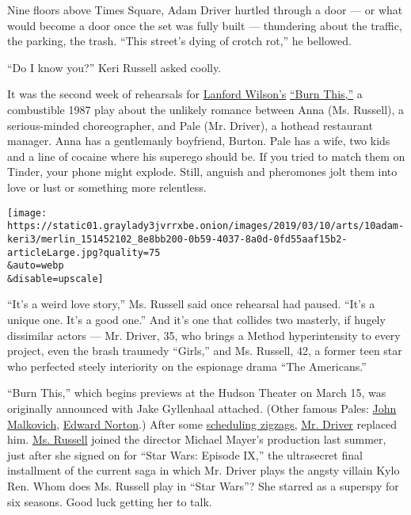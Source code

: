 Nine floors above Times Square, Adam Driver hurtled through a door ---
or what would become a door once the set was fully built --- thundering
about the traffic, the parking, the trash. ``This street's dying of
crotch rot,'' he bellowed.

``Do I know you?'' Keri Russell asked coolly.

It was the second week of rehearsals for
\href{https://www.nytimes3xbfgragh.onion/2011/03/25/theater/lanford-wilson-pulitzer-prize-winning-playwright-dies-at-73.html}{Lanford
Wilson's}
\href{http://www.thehudsonbroadway.com/whatson/burn-this/}{``Burn
This,''} a combustible 1987 play about the unlikely romance between Anna
(Ms. Russell), a serious-minded choreographer, and Pale (Mr. Driver), a
hothead restaurant manager. Anna has a gentlemanly boyfriend, Burton.
Pale has a wife, two kids and a line of cocaine where his superego
should be. If you tried to match them on Tinder, your phone might
explode. Still, anguish and pheromones jolt them into love or lust or
something more relentless.

\texttt{[image: https://static01.graylady3jvrrxbe.onion/images/2019/03/10/arts/10adam-keri3/merlin\_151452102\_8e8bb200-0b59-4037-8a0d-0fd55aaf15b2-articleLarge.jpg?quality=75\\\&auto=webp\\\&disable=upscale]}

``It's a weird love story,'' Ms. Russell said once rehearsal had paused.
``It's a unique one. It's a good one.'' And it's one that collides two
masterly, if hugely dissimilar actors --- Mr. Driver, 35, who brings a
Method hyperintensity to every project, even the brash traumedy
``Girls,'' and Ms. Russell, 42, a former teen star who perfected steely
interiority on the espionage drama ``The Americans.''

``Burn This,'' which begins previews at the Hudson Theater on March 15,
was originally announced with Jake Gyllenhaal attached. (Other famous
Pales:
\href{https://www.nytimes3xbfgragh.onion/1987/10/15/theater/stage-burn-this-by-wilson.html}{John
Malkovich},
\href{https://www.nytimes3xbfgragh.onion/2002/09/20/movies/theater-review-revival-works-a-transformation.html}{Edward
Norton}.) After some
\href{https://www.nytimes3xbfgragh.onion/2016/10/22/theater/jake-gyllenhaal-broadway-burn-this.html}{scheduling
zigzags},
\href{https://www.nytimes3xbfgragh.onion/2016/12/28/movies/adam-driver-interview-paterson-silence.html}{Mr.
Driver} replaced him.
\href{https://www.nytimes3xbfgragh.onion/2016/03/20/arts/television/keri-russell-discusses-the-americans-her-pregnancy-and-life-at-40.html}{Ms.
Russell} joined the director Michael Mayer's production last summer,
just after she signed on for ``Star Wars: Episode IX,'' the ultrasecret
final installment of the current saga in which Mr. Driver plays the
angsty villain Kylo Ren. Whom does Ms. Russell play in ``Star Wars''?
She starred as a superspy for six seasons. Good luck getting her to
talk.

